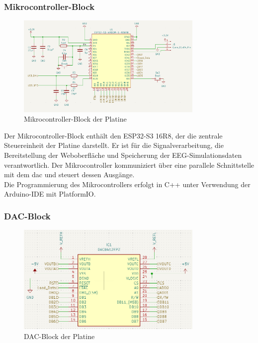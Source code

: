 \subsubsection{Mikrocontroller-Block}
\begin{figure}[H]
    \centering
    \includegraphics[width=0.8\textwidth]{bilder/Mikrocontroller_Block.png}
    \caption{Mikrocontroller-Block der Platine}
    \label{fig:mikrocontroller_block}
\end{figure}

Der Mikrocontroller-Block enthält den ESP32-S3 16R8, der die zentrale Steuereinheit der Platine darstellt. Er ist für die Signalverarbeitung, die Bereitstellung der Weboberfläche und Speicherung der EEG-Simulationsdaten verantwortlich. Der Mikrocontroller kommuniziert über eine parallele Schnittstelle mit dem \gls{dac} und steuert dessen Ausgänge.\\
Die Programmierung des Mikrocontrollers erfolgt in C++ unter Verwendung der Arduino-IDE mit PlatformIO. 

\subsubsection{DAC-Block}
\begin{figure}[H]
    \centering
    \includegraphics[width=0.8\textwidth]{bilder/DAC.png}
    \caption{DAC-Block der Platine}
    \label{fig:dac_block}
\end{figure}

